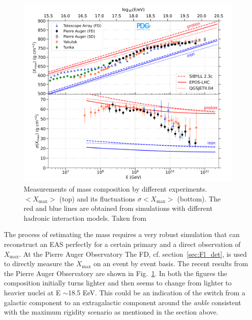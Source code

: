 \begin{figure}[t!]
  \centering
  \includegraphics[width=14.5cm]{thesis_figures/CRnNu/Composition_measurement.png}
  \caption{Measurements of mass composition by different experiments. $<X_{\text{max}}>$ (top) and its fluctuations $\sigma<X_{\text{max}}>$ (bottom). The red and blue lines are obtained from simulations with different hadronic interaction models. Taken from ~\cite{ParticleDataGroup:2024cfk}}
  \label{fig:CR-composition}
\end{figure}

The process of estimating the mass requires a very robust simulation that can reconstruct an EAS perfectly for a certain primary and a direct observation of $X_{\text{max}}$. At the Pierre Auger Observatory The \gls{FD}, cf. section~\ref{sec:Fl_det}, is used to directly measure the $X_{\text{max}}$ on an event by event basis. The recent results from the Pierre Auger Observatory are shown in Fig.~\ref{fig:CR-composition}. In both the figures the composition initially turns lighter and then seems to change from lighter to heavier nuclei at E $\sim$18.5 EeV. This could be an indication of the switch from a galactic component to an extragalactic component around the \textit{ankle} consistent with the maximum rigidity scenario as mentioned in the section above.

